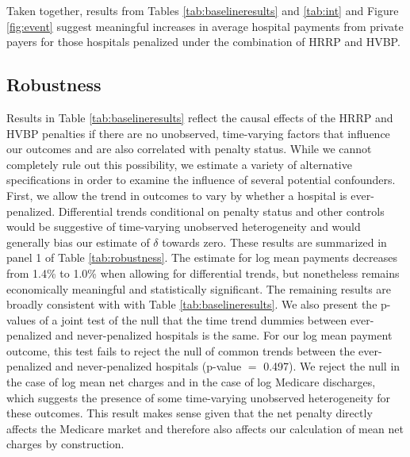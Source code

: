 \documentclass[12pt]{article}
\begin{document}
Taken together, results from Tables \ref{tab:baselineresults} and \ref{tab:int} and Figure \ref{fig:event} suggest meaningful increases in average hospital payments from private payers for those hospitals penalized under the combination of HRRP and HVBP.  


\subsection{Robustness}
Results in Table \ref{tab:baselineresults} reflect the causal effects of the HRRP and HVBP penalties if there are no unobserved, time-varying factors that influence our outcomes and are also correlated with penalty status.  While we cannot completely rule out this possibility, we estimate a variety of alternative specifications in order to examine the influence of several potential confounders.  First, we allow the trend in outcomes to vary by whether a hospital is ever-penalized. Differential trends conditional on penalty status and other controls would be suggestive of time-varying unobserved heterogeneity and would generally bias our estimate of $\delta$ towards zero.  These results are summarized in panel 1 of Table \ref{tab:robustness}. The estimate for log mean payments decreases from 1.4\% to 1.0\% when allowing for differential trends, but nonetheless remains economically meaningful and statistically significant. The remaining results are broadly consistent with with Table \ref{tab:baselineresults}. We also present the p-values of a joint test of the null that the time trend dummies between ever-penalized and never-penalized hospitals is the same. For our log mean payment outcome, this test fails to reject the null of common trends between the ever-penalized and never-penalized hospitals (p-value $=$ 0.497). We reject the null in the case of log mean net charges and in the case of log Medicare discharges, which suggests the presence of some time-varying unobserved heterogeneity for these outcomes. This result makes sense given that the net penalty directly affects the Medicare market and therefore also affects our calculation of mean net charges by construction.  
\end{document}
